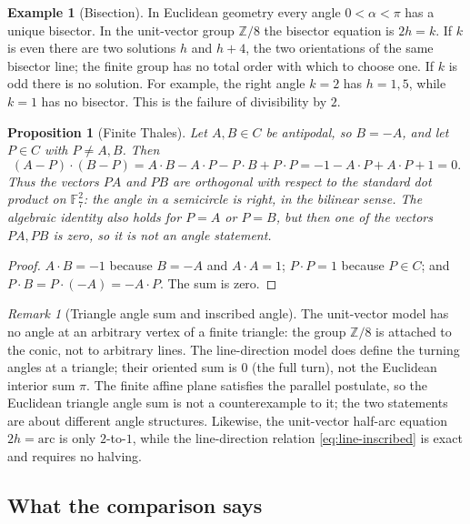 \documentclass[11pt]{article}
\newtheorem{proposition}[theorem]{Proposition}
\theoremstyle{definition}
\newtheorem{example}[theorem]{Example}
\theoremstyle{remark}
\newtheorem{remark}[theorem]{Remark}
\newcommand{\F}{\mathbb{F}}
\newcommand{\Z}{\mathbb{Z}}
\begin{document}
\begin{example}[Bisection]\label{ex:bisection}
In Euclidean geometry every angle $0<\alpha<\pi$ has a unique bisector.  In the
unit-vector group $\Z/8$ the bisector equation is $2h=k$.  If $k$ is even there
are two solutions $h$ and $h+4$, the two orientations of the same bisector line;
the finite group has no total order with which to choose one.  If $k$ is odd there is
no solution.  For example, the right angle $k=2$ has $h=1,5$, while $k=1$ has no
bisector.  This is the failure of divisibility by $2$.
\end{example}

\begin{proposition}[Finite Thales]\label{prop:finite-thales}
Let $A,B\in C$ be antipodal, so $B=-A$, and let $P\in C$ with $P\ne A,B$.  Then
\[
  (A-P)\cdot(B-P)=A\cdot B-A\cdot P-P\cdot B+P\cdot P
  =-1-A\cdot P+A\cdot P+1=0 .
\]
Thus the vectors $PA$ and $PB$ are orthogonal with respect to the standard dot
product on $\F_7^2$: the angle in a semicircle is right, in the bilinear sense.
The algebraic identity also holds for $P=A$ or $P=B$, but then one of the
vectors $PA,PB$ is zero, so it is not an angle statement.
\end{proposition}

\begin{proof}
$A\cdot B=-1$ because $B=-A$ and $A\cdot A=1$; $P\cdot P=1$ because $P\in C$;
and $P\cdot B=P\cdot(-A)=-A\cdot P$.  The sum is zero.
\end{proof}

\begin{remark}[Triangle angle sum and inscribed angle]
The unit-vector model has no angle at an arbitrary vertex of a finite triangle:
the group $\Z/8$ is attached to the conic, not to arbitrary lines.  The
line-direction model does define the turning angles at a triangle; their
oriented sum is $0$ (the full turn), not the Euclidean interior sum $\pi$.  The
finite affine plane satisfies the parallel postulate, so the Euclidean triangle
angle sum is not a counterexample to it; the two statements are about different
angle structures.  Likewise, the unit-vector half-arc equation $2h=\text{arc}$
is only $2$-to-$1$, while the line-direction relation
\eqref{eq:line-inscribed} is exact and requires no halving.
\end{remark}

\subsection{What the comparison says}
\end{document}
